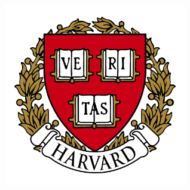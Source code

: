 \documentclass[portrait,a0b,final,a4resizeable]{include/a0poster}
\begin{document}
\begin{poster}
\begin{center}
\begin{pcolumn}{1.03}
{\begin{minipage}[c]{\logowidth}
\begin{flushright}
    \includegraphics[width=8cm,trim=2em 0em 2em 2em, clip]{badges/harvard}
  \end{flushright}
\end{minipage}
%
}
\end{pcolumn}
\end{center}

\vspace*{1cm}

\large




\Large

\begin{multicols}{2}




%


\end{multicols}
\end{poster}
\end{document}
